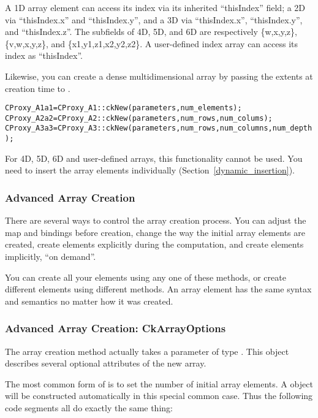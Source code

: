 A 1D array element can access its index via its inherited ``thisIndex''
field; a 2D via ``thisIndex.x'' and ``thisIndex.y'', and a 3D via
``thisIndex.x'', ``thisIndex.y'', and ``thisIndex.z''. The subfields
of 4D, 5D, and 6D are respectively \{w,x,y,z\}, \{v,w,x,y,z\}, and 
\{x1,y1,z1,x2,y2,z2\}.
A user-defined index array can access its index as ``thisIndex''.


Likewise, you can create a dense multidimensional array by passing the 
extents at creation time to .

\begin{alltt}
CProxy_A1 a1 = CProxy_A1::ckNew(parameters, num_elements);
CProxy_A2 a2 = CProxy_A2::ckNew(parameters, num_rows, num_colums);
CProxy_A3 a3 = CProxy_A3::ckNew(parameters, num_rows, num_columns, num_depth);
\end{alltt}

For 4D, 5D, 6D and user-defined arrays, this functionality cannot be used. 
You need to insert the array elements individually (Section~\ref{dynamic_insertion}).

\subsubsection{Advanced Array Creation}

\label{advanced array create}
There are several ways to control the array creation process.
You can adjust the map and bindings before creation, change
the way the initial array elements are created, create elements
explicitly during the computation, and create elements implicitly,
``on demand''.  

You can create all your elements using any one of these methods,
or create different elements using different methods.  
An array element has the same syntax and semantics no matter
how it was created.


\subsubsection{Advanced Array Creation: CkArrayOptions}

\label{CkArrayOptions}

The array creation method  actually takes a parameter
of type .  This object describes several
optional attributes of the new array.

The most common form of  is to set the number
of initial array elements.  A  object will be 
constructed automatically in this special common case.  Thus
the following code segments all do exactly the same thing:

